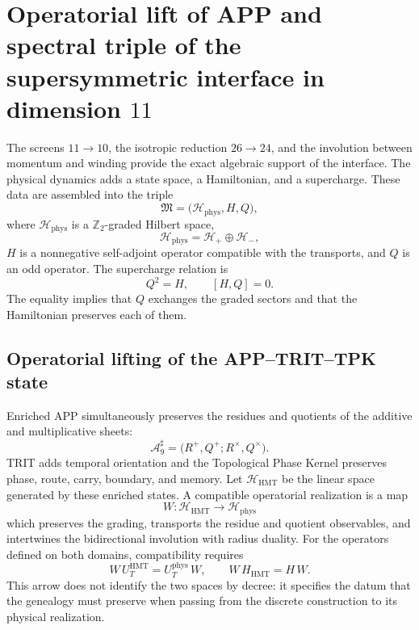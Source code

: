 \section[APP raised and spectral triple in dimension 11]{Operatorial lift of APP and spectral triple of the supersymmetric interface in dimension \texorpdfstring{\(11\)}{11}}
\label{sec:sucesor83-terna-espectral-teoria-m}

The screens \(11\to10\), the isotropic reduction \(26\to24\), and the
involution between momentum and winding provide the exact algebraic support
of the interface. The physical dynamics adds a state space, a
Hamiltonian, and a supercharge. These data are assembled into the triple
\[
 \mathfrak M
 =\bigl(\mathcal H_{\mathrm{phys}},H,Q\bigr),
\]
where \(\mathcal H_{\mathrm{phys}}\) is a
\(\mathbb Z_2\)-graded Hilbert space,
\[
 \mathcal H_{\mathrm{phys}}
 =\mathcal H_+\oplus\mathcal H_-,
\]
\(H\) is a nonnegative self-adjoint operator compatible with the transports,
and \(Q\) is an odd operator. The supercharge relation is
\begin{equation}
 Q^2=H,
 \qquad
 [H,Q]=0.
 \label{eq:sucesor83-supercarga-cuadrado-hamiltoniano}
\end{equation}
The equality implies that \(Q\) exchanges the graded sectors and that the
Hamiltonian preserves each of them.

\subsection{Operatorial lifting of the APP--TRIT--TPK state}

Enriched APP simultaneously preserves the residues and quotients of the
additive and multiplicative sheets:
\[
 \mathcal A_9^\sharp
 =\bigl(R^+,Q^+;R^\times,Q^\times\bigr).
\]
TRIT adds temporal orientation and the Topological Phase Kernel preserves
phase, route, carry, boundary, and memory. Let
\(\mathcal H_{\mathrm{HMT}}\) be the linear space generated by these enriched states.
A compatible operatorial realization is a map
\[
 W:\mathcal H_{\mathrm{HMT}}
 \longrightarrow\mathcal H_{\mathrm{phys}}
\]
which preserves the grading, transports the residue and quotient observables,
and intertwines the bidirectional involution with radius duality. For the
operators defined on both domains, compatibility requires
\[
 W\,U_T^{\mathrm{HMT}}
 =U_T^{\mathrm{phys}}\,W,
 \qquad
 W\,H_{\mathrm{HMT}}
 =H\,W.
\]
This arrow does not identify the two spaces by decree: it specifies the datum
that the genealogy must preserve when passing from the discrete construction to its
physical realization.

